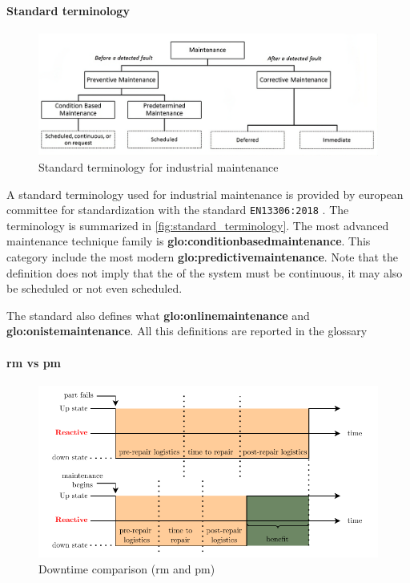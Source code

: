 \paragraph*{Standard terminology}
\begin{figure}
    \centering
    \includegraphics[width=\textwidth]{images/StateArt/EN13306.png}
    \caption{Standard terminology for industrial maintenance \cite{rastegari2017condition}}
    \label{fig:standard_terminology}
\end{figure}

A standard terminology used for industrial maintenance is provided by european committee for standardization with the standard \texttt{EN13306:2018} \cite{EN13306:2018}. The terminology is summarized in \autoref{fig:standard_terminology}. The most advanced maintenance technique family is \textbf{\gls{glo:conditionbasedmaintenance}}. This category include the most modern \textbf{\gls{glo:predictivemaintenance}}. Note that the definition does not imply that the  of the system must be continuous, it may also be scheduled or not even scheduled.

The standard also defines what \textbf{\gls{glo:onlinemaintenance}} and \textbf{\gls{glo:onistemaintenance}}. All this definitions are reported in the {glossary}


\paragraph*{\gls{rm} vs \gls{pm}}
\begin{figure}
    \centering
    \includegraphics[scale=0.9]{images/StateArt/lost_opportunities.pdf}
    \caption{Downtime comparison (\gls{rm} and \gls{pm})}
    \label{fig:lost_opportunities}
\end{figure}

